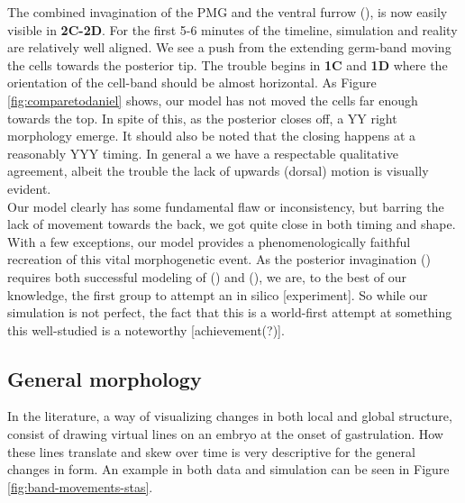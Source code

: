 The combined invagination of the PMG and the ventral furrow (), is now easily visible in \textbf{2C-}\textbf{2D}. For the first 5-6 minutes of the timeline, simulation and reality are relatively well aligned. We see a push from the extending germ-band moving the cells towards the posterior tip. The trouble begins in \textbf{1C} and \textbf{1D} where the orientation of the cell-band should be almost horizontal. As Figure \ref{fig:comparetodaniel} shows, our model has not moved the cells far enough towards the top. In spite of this, as the posterior closes off, a YY right morphology emerge. It should also be noted that the closing happens at a reasonably YYY timing. In general a we have a respectable qualitative agreement, albeit the trouble the lack of upwards (dorsal) motion is visually evident.\\



Our model clearly has some fundamental flaw or inconsistency, but barring the lack of movement towards the back, we got quite close in both timing and shape. With a few exceptions, our model provides a phenomenologically faithful recreation of this vital morphogenetic event. As the posterior invagination () requires both successful modeling of () and (), we are, to the best of our knowledge, the first group to attempt an in silico [experiment]. So while our simulation is not perfect, the fact that this is a world-first attempt at something this well-studied is a  noteworthy [achievement(?)].\\

 

\subsection{General morphology}
In the literature, a way of visualizing changes in both local and global structure, consist of drawing virtual lines on an embryo at the onset of gastrulation. How these lines translate and skew over time is very descriptive for the general changes in form. An example in both data and simulation can be seen in Figure \ref{fig:band-movements-stas}.

